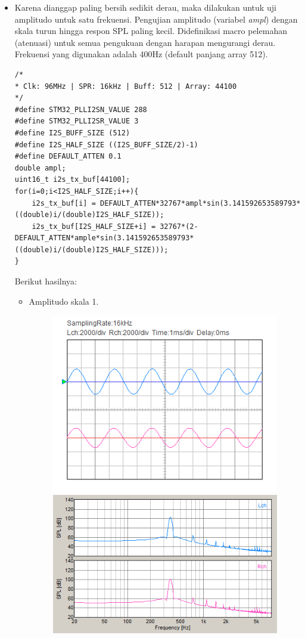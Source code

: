 \documentclass[12pt,]{article}
\begin{document}
\begin{itemize}
\begin{itemize}
		\newpage
		\item Karena dianggap paling bersih sedikit derau, maka dilakukan untuk uji amplitudo untuk satu frekuensi.
		Pengujian amplitudo (variabel \textit{ampl}) dengan skala turun hingga respon SPL paling kecil.
		Didefinikasi macro pelemahan (atenuasi) untuk semua pengukuan dengan harapan mengurangi derau.
		Frekuensi yang digunakan adalah 400Hz (default panjang array 512).
\begin{verbatim}
/*
* Clk: 96MHz | SPR: 16kHz | Buff: 512 | Array: 44100
*/
#define STM32_PLLI2SN_VALUE 288
#define STM32_PLLI2SR_VALUE 3
#define I2S_BUFF_SIZE (512)
#define I2S_HALF_SIZE ((I2S_BUFF_SIZE/2)-1)
#define DEFAULT_ATTEN 0.1
double ampl;
uint16_t i2s_tx_buf[44100];
for(i=0;i<I2S_HALF_SIZE;i++){
	i2s_tx_buf[i] = DEFAULT_ATTEN*32767*ampl*sin(3.141592653589793*((double)i/(double)I2S_HALF_SIZE));
	i2s_tx_buf[I2S_HALF_SIZE+i] = 32767*(2-DEFAULT_ATTEN*ample*sin(3.141592653589793*((double)i/(double)I2S_HALF_SIZE)));
}
\end{verbatim}
		Berikut hasilnya:
		\begin{itemize}
			\item Amplitudo skala 1.
			\begin{figure}[H]
				\centering
				\includegraphics[width=0.45\linewidth]{result/day_3/400_Hz/osi_tone10}
				\includegraphics[width=0.45\linewidth]{result/day_3/400_Hz/fft_tone10}
			\end{figure}
		

\end{itemize}
\end{itemize}
\end{itemize}
\end{document}
